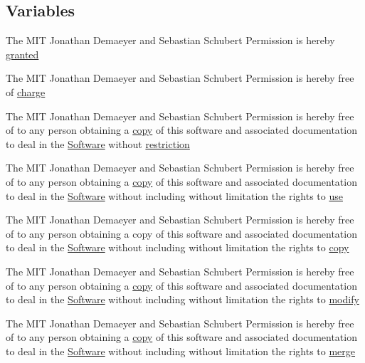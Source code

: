 \subsection*{Variables}
\begin{DoxyCompactItemize}
\item 
The M\+IT Jonathan Demaeyer and Sebastian Schubert Permission is hereby \hyperlink{LICENSE_8txt_ac7e44340bb6146ecd6a7c8a53e31a570}{granted}
\item 
The M\+IT Jonathan Demaeyer and Sebastian Schubert Permission is hereby free of \hyperlink{LICENSE_8txt_ae4c62759c18e28e5c000054c93973da6}{charge}
\item 
The M\+IT Jonathan Demaeyer and Sebastian Schubert Permission is hereby free of to any person obtaining a \hyperlink{LICENSE_8txt_a51c339ce34cc545067d7d7c01c627159}{copy} of this software and associated documentation to deal in the \hyperlink{LICENSE_8txt_a5972617605af8d0ee35a18608e832e08}{Software} without \hyperlink{LICENSE_8txt_ac2af11c5ae84efcd63ec3aa6cc6c0ea4}{restriction}
\item 
The M\+IT Jonathan Demaeyer and Sebastian Schubert Permission is hereby free of to any person obtaining a \hyperlink{LICENSE_8txt_a51c339ce34cc545067d7d7c01c627159}{copy} of this software and associated documentation to deal in the \hyperlink{LICENSE_8txt_a5972617605af8d0ee35a18608e832e08}{Software} without including without limitation the rights to \hyperlink{LICENSE_8txt_a6ca773d794202b7a0332b26f7740ee6e}{use}
\item 
The M\+IT Jonathan Demaeyer and Sebastian Schubert Permission is hereby free of to any person obtaining a copy of this software and associated documentation to deal in the \hyperlink{LICENSE_8txt_a5972617605af8d0ee35a18608e832e08}{Software} without including without limitation the rights to \hyperlink{LICENSE_8txt_a51c339ce34cc545067d7d7c01c627159}{copy}
\item 
The M\+IT Jonathan Demaeyer and Sebastian Schubert Permission is hereby free of to any person obtaining a \hyperlink{LICENSE_8txt_a51c339ce34cc545067d7d7c01c627159}{copy} of this software and associated documentation to deal in the \hyperlink{LICENSE_8txt_a5972617605af8d0ee35a18608e832e08}{Software} without including without limitation the rights to \hyperlink{LICENSE_8txt_a052fb1278b9c5ca8859c1b9d4f7807a0}{modify}
\item 
The M\+IT Jonathan Demaeyer and Sebastian Schubert Permission is hereby free of to any person obtaining a \hyperlink{LICENSE_8txt_a51c339ce34cc545067d7d7c01c627159}{copy} of this software and associated documentation to deal in the \hyperlink{LICENSE_8txt_a5972617605af8d0ee35a18608e832e08}{Software} without including without limitation the rights to \hyperlink{LICENSE_8txt_a581681f5201fdd4632f6b981d27e5234}{merge}

\end{DoxyCompactItemize}
